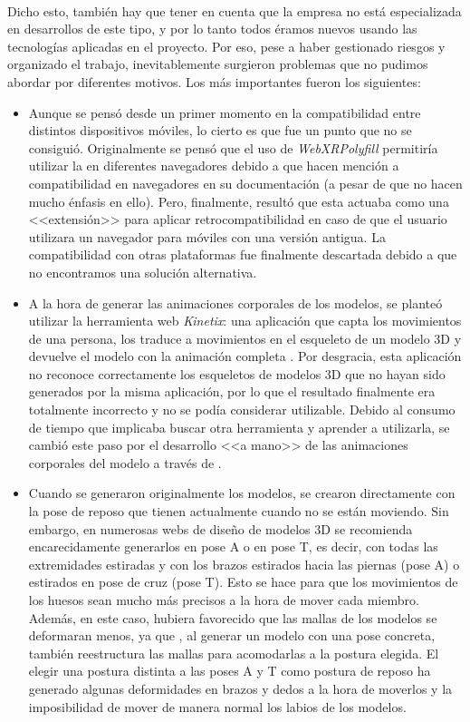 \documentclass{subfiles}
\begin{document}
    \paragraph{}
    Dicho esto, también hay que tener en cuenta que la empresa no está especializada en desarrollos de este tipo, y por lo tanto todos éramos nuevos usando las tecnologías aplicadas en el proyecto. Por eso, pese a haber gestionado riesgos y organizado el trabajo, inevitablemente surgieron problemas que no pudimos abordar por diferentes motivos. Los más importantes fueron los siguientes:

    \begin{itemize}
        \item Aunque se pensó desde un primer momento en la compatibilidad entre distintos dispositivos móviles, lo cierto es que fue un punto que no se consiguió. Originalmente se pensó que el uso de \textit{WebXRPolyfill} permitiría utilizar la \ra en diferentes navegadores debido a que hacen mención a compatibilidad en navegadores en su documentación \cite{web:webxrpolyfill} (a pesar de que no hacen mucho énfasis en ello). Pero, finalmente, resultó que esta actuaba como una <<extensión>> para aplicar retrocompatibilidad en caso de que el usuario utilizara un navegador \googlechrome para móviles con una versión antigua. La compatibilidad con otras plataformas fue finalmente descartada debido a que no encontramos una solución alternativa.
        \item A la hora de generar las animaciones corporales de los modelos, se planteó utilizar la herramienta web \textit{Kinetix}: una aplicación que capta los movimientos de una persona, los traduce a movimientos en el esqueleto de un modelo 3D y devuelve el modelo con la animación completa \cite{web:kinetix}. Por desgracia, esta aplicación no reconoce correctamente los esqueletos de modelos 3D que no hayan sido generados por la misma aplicación, por lo que el resultado finalmente era totalmente incorrecto y no se podía considerar utilizable. Debido al consumo de tiempo que implicaba buscar otra herramienta y aprender a utilizarla, se cambió este paso por el desarrollo <<a mano>> de las animaciones corporales del modelo a través de \blender.
        \item Cuando se generaron originalmente los modelos, se crearon directamente con la pose de reposo que tienen actualmente cuando no se están moviendo. Sin embargo, en numerosas webs de diseño de modelos 3D se recomienda encarecidamente generarlos en pose A o en pose T, es decir, con todas las extremidades estiradas y con los brazos estirados hacia las piernas (pose A) o estirados en pose de cruz (pose T). Esto se hace para que los movimientos de los huesos sean mucho más precisos a la hora de mover cada miembro. Además, en este caso, hubiera favorecido que las mallas de los modelos se deformaran menos, ya que \makehuman, al generar un modelo con una pose concreta, también reestructura las mallas para acomodarlas a la postura elegida. El elegir una postura distinta a las poses A y T como postura de reposo ha generado algunas deformidades en brazos y dedos a la hora de moverlos y la imposibilidad de mover de manera normal los labios de los modelos.

\end{itemize}
\end{document}
